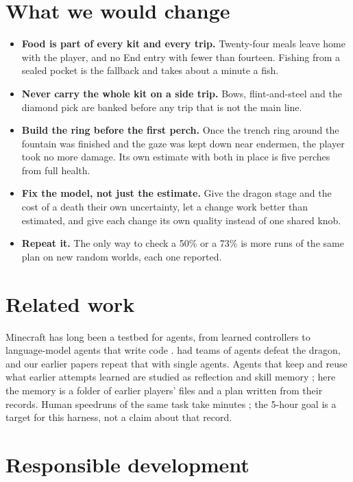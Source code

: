 \documentclass[11pt,a4paper]{article}
\begin{document}
\section{What we would change}

\begin{itemize}
\item \textbf{Food is part of every kit and every trip.} Twenty-four meals leave home with the player, and no End entry with fewer than fourteen. Fishing from a sealed pocket is the fallback and takes about a minute a fish.
\item \textbf{Never carry the whole kit on a side trip.} Bows, flint-and-steel and the diamond pick are banked before any trip that is not the main line.
\item \textbf{Build the ring before the first perch.} Once the trench ring around the fountain was finished and the gaze was kept down near endermen, the player took no more damage. Its own estimate with both in place is five perches from full health.
\item \textbf{Fix the model, not just the estimate.} Give the dragon stage and the cost of a death their own uncertainty, let a change work better than estimated, and give each change its own quality instead of one shared knob.
\item \textbf{Repeat it.} The only way to check a 50\% or a 73\% is more runs of the same plan on new random worlds, each one reported.
\end{itemize}

\section{Related work}

Minecraft has long been a testbed for agents, from learned controllers \citep{baker2022vpt,hafner2025dreamer} to language-model agents that write code \citep{wang2024voyager,zhu2023gitm}. \citet{faldor2026team} had teams of agents defeat the dragon, and our earlier papers repeat that with single agents. Agents that keep and reuse what earlier attempts learned are studied as reflection and skill memory \citep{shinn2023reflexion,wang2024awm}; here the memory is a folder of earlier players' files and a plan written from their records. Human speedruns of the same task take minutes \citep{speedrun2026}; the 5-hour goal is a target for this harness, not a claim about that record.

\section{Responsible development}
\end{document}
